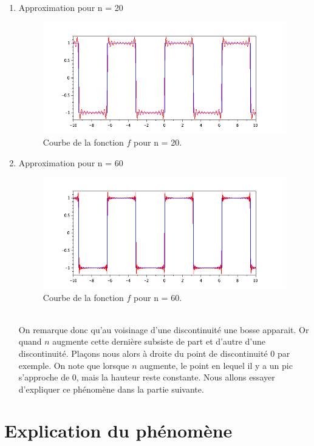 \documentclass[a4paper,12pt]{report}
\begin{document}
\begin{enumerate}
	\item Approximation pour n = 20
		\begin{figure}[h!]
		\centering
		\includegraphics[scale=0.6]{ex3_figN20.png}
		\caption{\label{ex3figN20}Courbe de la fonction $f$ pour n = 20.}
		\end{figure}
		
	\item Approximation pour n = 60
		\begin{figure}[h!]
		\centering
		\includegraphics[scale=0.6]{ex3_figN60.png}
		\caption{\label{ex3figN60}Courbe de la fonction $f$ pour n = 60.}
		\end{figure}\\

On remarque donc qu'au voisinage d'une discontinuit\'e une bosse apparait. Or quand $n$ augmente cette derni\`ere subsiste de part et d'autre d'une discontinuit\'e. Pla\c cons nous alors \`a droite du point de discontinuit\'e $0$ par exemple. On note que lorsque $n$ augmente, le point en lequel il y a un pic s'approche de $0$, mais la hauteur reste constante. Nous allons essayer d'expliquer ce ph\'enom\`ene dans la partie suivante.
\end{enumerate}
\newpage
\section{Explication du ph\'enom\`ene}
\end{document}
